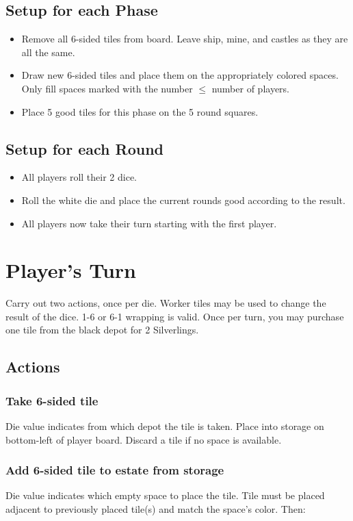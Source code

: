 \documentclass[12pt]{article}
\newenvironment{itemizeCustom}
{\begin{itemize}
  \setlength{\itemsep}{1pt}
  \setlength{\parskip}{0pt}
  \setlength{\parsep}{0pt}}
{\end{itemize}}
\begin{document}
\begin{multicols*}{2}
\subsection*{Setup for each Phase}
\begin{itemizeCustom}
	\item Remove all 6-sided tiles from board. Leave ship, mine, and castles as they are all the same.
	\item Draw new 6-sided tiles and place them on the appropriately colored spaces. Only fill spaces marked with the number $\le$ number of players.
	\item Place 5 good tiles for this phase on the 5 round squares.
\end{itemizeCustom}

\subsection*{Setup for each Round}
\begin{itemizeCustom}
	\item All players roll their 2 dice.
	\item Roll the white die and place the current rounds good according to the result.
	\item All players now take their turn starting with the first player.
\end{itemizeCustom}

\section*{Player's Turn}
Carry out two actions, once per die. Worker tiles may be used to change the result of the dice. 1-6 or 6-1 wrapping is valid. Once per turn, you may purchase one tile from the black depot for 2 Silverlings.

\subsection*{Actions}
\subsubsection*{Take 6-sided tile}
Die value indicates from which depot the tile is taken. Place into storage on bottom-left of player board. Discard a tile if no space is available.

\subsubsection*{Add 6-sided tile to estate from storage}
Die value indicates which empty space to place the tile. Tile must be placed adjacent to previously placed tile(s) and match the space's color. Then:


\end{multicols*}
\end{document}
